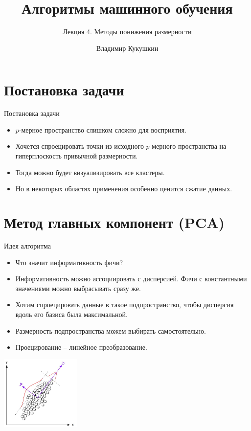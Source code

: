 \documentclass[9pt]{beamer}
\title{Алгоритмы машинного обучения}
\subtitle{Лекция 4. Методы понижения размерности}
\author{Владимир Кукушкин}
\institute{СПбГЭУ - 02.12.2020}
\begin{document}
\titlepage

\section{Постановка задачи}

\begin{frame}{Постановка задачи}
\begin{itemize}
    \item $p$-мерное пространство слишком сложно для восприятия.
    \item Хочется спроецировать точки из исходного $p$-мерного пространства на гиперплоскость привычной размерности.
    \item Тогда можно будет визуализировать все кластеры.
    \item Но в некоторых областях применения особенно ценится сжатие данных.
\end{itemize}
\end{frame}

\section{Метод главных компонент (PCA)}
\begin{frame}{Идея алгоритма}
\begin{itemize}
    \item Что значит информативность фичи? 
    \item Информативность можно ассоциировать с дисперсией. Фичи с константными значениями можно выбрасывать сразу же.
    \item Хотим спроецировать данные в такое подпространство, чтобы дисперсия вдоль его базиса была максимальной.
    \item Размерность подпространства можем выбирать самостоятельно.
    \item Проецирование -- линейное преобразование.
\end{itemize}
\begin{center}\includegraphics[width=150px]{img/pca_idea.png}\end{center}
\end{frame}
\end{document}
